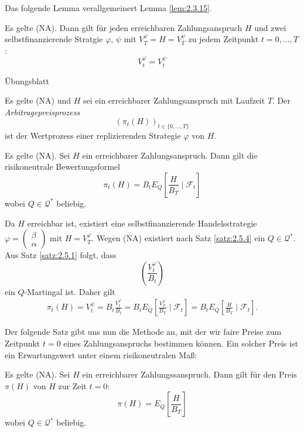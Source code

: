 \documentclass[a4paper,twoside,DIV15,BCOR12mm]{scrbook}
\newcommand{\cF}{\mathcal F}
\newcommand{\cQ}{\mathcal Q}
\begin{document}
Das folgende Lemma verallgemeinert Lemma \ref{lem:2.3.15}. 
\begin{lemma}
Es gelte (NA). Dann gilt für jeden erreichbaren Zahlungsanspruch $H$ und zwei selbstfinanzierende Stratgie $\varphi$, $\psi$ mit $V_T^\varphi = H = V_T^\psi$ zu jedem Zeitpunkt $t=0,\ldots,T$: \label{lem:2.5.6}
\[
V_t^\varphi = V_t^\psi
\]
\end{lemma}
\begin{beweis}
Übungsblatt
\end{beweis}

\begin{definition}
Es gelte (NA) und $H$ sei ein erreichbarer Zahlungsanspruch mit Laufzeit $T$. Der \emph{Arbitragepreisprozess}
\[
(\pi_t(H))_{t\in\{0,\ldots,T\}}
\]
ist der Wertprozess einer replizierenden Strategie $\varphi$ von $H$.
\end{definition}

\begin{satz}
Es gelte (NA). Sei $H$ ein erreichbarer Zahlungsanspruch. Dann gilt die risikoneutrale Bewertungsformel\label{satz:2.5.8}
\[
\pi_t(H) = B_t E_Q[\frac H{B_T}\mid \cF_t]
\]
wobei $Q\in \cQ^*$ beliebig.
\end{satz}

\begin{beweis}
Da $H$ erreichbar ist, existiert eine selbstfinanzierende Handelsstrategie 
$\varphi=\left(\begin{smallmatrix} \beta \\ \alpha \end{smallmatrix}\right)$
mit $H = V_T^\varphi$. Wegen (NA) existiert nach Satz \ref{satz:2.5.4} ein $Q\in\cQ^*$. Aus Satz \ref{satz:2.5.1} folgt, dass 
\[
\left(\frac{V_t^\varphi}{B_t}\right)
\]
ein $Q$-Martingal ist. Daher gilt
\begin{align*}
\pi_t(H) = V_t^\varphi = B_t \frac{V_t^\varphi}{B_t} = B_t E_Q [ \frac{V_T^\varphi}{B_T} \mid \cF_t] = B_t E_Q[ \frac H {B_T} \mid \cF_t].
\end{align*}
\end{beweis}

Der folgende Satz gibt uns nun die Methode an, mit der wir faire Preise zum Zeitpunkt $t=0$ eines Zahlungsanspruchs bestimmen können. Ein solcher Preis ist ein Erwartungswert unter einem risikoneutralen Maß:

\begin{korollar}
Es gelte (NA). Sei $H$ ein erreichbarer Zahlungssanspruch. Dann gilt für den Preis $\pi(H)$ von $H$ zur Zeit $t=0$:
\[
\pi(H) = E_Q[\frac{H}{B_T}]
\]
wobei $Q\in \cQ^*$ beliebig.
\end{korollar}
\end{document}
